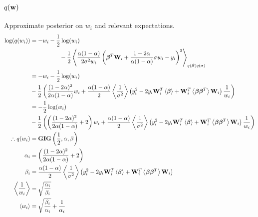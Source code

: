 \begin{appendices}
\subsection{ $q(\mathbf{w})$}
Approximate posterior on $w_i$ and relevant expectations.
\begin{align}
\nonumber
\log (q(w_i))&=-w_i-\frac{1}{2}\log(w_i)\\
\nonumber
&\qquad\qquad\quad-\frac{1}{2}\left\langle\frac{\alpha(1-\alpha)}{2\sigma^2 w_i}\left(\bm{\beta}^T \mathbf{W}_i+\frac{1-2\alpha}{\alpha(1-\alpha)}\sigma w_i-y_i\right)^2\right\rangle_{q(\bm{\beta})q(\sigma)}\\
\nonumber
&=-w_i-\frac{1}{2}\log(w_i)\\
\nonumber&-\frac{1}{2}\left(\frac{(1-2\alpha)^2}{2\alpha(1-\alpha)}w_i+\frac{\alpha(1-\alpha)}{2}\left\langle\frac{1}{\sigma^2}\right\rangle\left(y_i^2-2y_i\mathbf{W}_i^T\left\langle\bm{\beta}\right\rangle+\mathbf{W}_i^T\left\langle\bm{\beta}\bm{\beta}^T\right\rangle\mathbf{W}_i\right)\frac{1}{w_i}\right)\\
\nonumber
&=-\frac{1}{2}\log(w_i)\\
\nonumber&-\frac{1}{2}\left(\left(\frac{(1-2\alpha)^2}{2\alpha(1-\alpha)}+2\right)w_i+\frac{\alpha(1-\alpha)}{2}\left\langle\frac{1}{\sigma^2}\right\rangle\left(y_i^2-2y_i\mathbf{W}_i^T\left\langle\bm{\beta}\right\rangle+\mathbf{W}_i^T\left\langle\bm{\beta}\bm{\beta}^T\right\rangle\mathbf{W}_i\right)\frac{1}{w_i}\right)\\
\therefore q(w_i) & = \mathbf{GIG}\left(\frac{1}{2},\alpha,\beta\right)\\
\alpha_i & =\left(\frac{(1-2\alpha)^2}{2\alpha(1-\alpha)}+2\right) \\
\beta_i & = \frac{\alpha(1-\alpha)}{2}\left\langle\frac{1}{\sigma^2}\right\rangle\left(y_i^2-2y_i\mathbf{W}_i^T\left\langle\bm{\beta}\right\rangle+\mathbf{W}_i^T\left\langle\bm{\beta}\bm{\beta}^T\right\rangle\mathbf{W}_i\right)\\
\left\langle\frac{1}{w_i}\right\rangle&=\sqrt{\frac{\alpha_i}{\beta_i}}\\
\left\langle w_i\right\rangle&=\sqrt{\frac{\beta_i}{\alpha_i}}+\frac{1}{\alpha_i}
\end{align}


\end{appendices}
